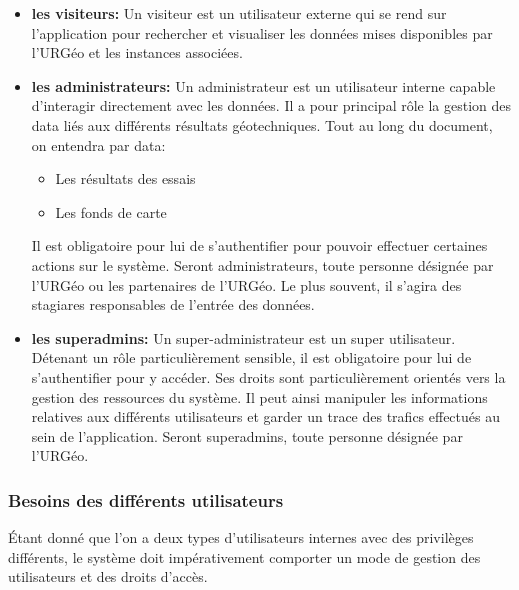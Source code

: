         \begin{itemize} 
                \item \textbf{les visiteurs: }
                Un visiteur est un utilisateur externe qui se rend sur l'application pour rechercher et visualiser
                les données mises disponibles par l'URGéo et les instances associées. 
              
                \item \textbf{les administrateurs: }
                Un administrateur est un utilisateur interne capable d'interagir directement avec les données. 
                Il a pour principal rôle la gestion des data 
                liés aux différents résultats géotechniques. Tout au long du document, on entendra par data:
                \begin{itemize}
                        \item Les résultats des essais 
                        \item Les fonds de carte
                \end{itemize}
                Il est obligatoire pour lui de s'authentifier pour pouvoir 
                effectuer certaines actions sur le système. Seront administrateurs, toute personne désignée par l'URGéo
                ou les partenaires de l'URGéo. Le plus souvent, il s'agira des stagiares responsables de l'entrée 
                des données.

                \item \textbf{les superadmins: }
                Un super-administrateur est un super utilisateur. Détenant un rôle particulièrement sensible,
                il est obligatoire pour lui de s'authentifier pour y accéder. Ses droits sont particulièrement orientés 
                vers la gestion des ressources du système. Il peut ainsi manipuler les informations relatives aux 
                différents utilisateurs et garder un trace des trafics effectués au sein de l'application.
                 Seront superadmins, toute personne désignée par l'URGéo.
            \end{itemize}   
        \subsubsection{Besoins des différents utilisateurs}
        Étant donné que l'on a deux types d'utilisateurs internes avec des privilèges différents,
        le système doit impérativement comporter un mode de gestion des utilisateurs et des droits d'accès.
